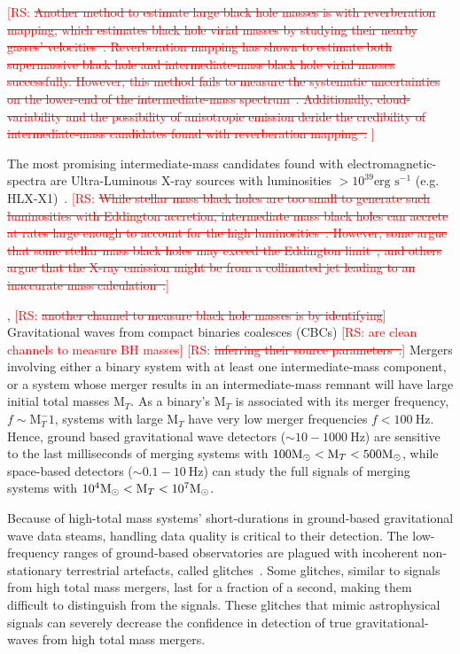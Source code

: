 \documentclass[%
 nofootinbib,
 amsmath,amssymb,
 aps,
 twocolumn
]{revtex4-2}
\newcommand{\mathcmd}[1]{{\sc \relax\ifmmode#1\else $#1$\fi}\xspace}
\newcommand{\msun}{\mathcmd{\text{M}_\odot}}
\newcommand{\rs}[1]{\textcolor{red}{[RS: #1]}}
\begin{document}
\rs{\sout{Another method to estimate large black hole masses is with reverberation mapping, which estimates black hole virial masses by studying their nearby gasses' velocities~\cite{reverberation mapping}. Reverberation mapping has shown to estimate both supermassive black hole and intermediate-mass black hole virial masses successfully. However, this method fails to measure the systematic uncertainties on the lower-end of the intermediate-mass spectrum~\cite{}. Additionally, cloud-variability and the possibility of anisotropic emission deride the credibility of intermediate-mass candidates found with reverberation mapping~\cite{}. }}

The most promising intermediate-mass candidates found with electromagnetic-spectra are Ultra-Luminous X-ray sources with luminosities $> 10^{39} \text{erg s}^{-1}$ (e.g. HLX-X1)~\cite{}. \rs{\sout{While stellar mass black holes are too small to generate such luminosities with Eddington accretion, intermediate mass black holes can accrete at rates large enough to account for the high luminosities~\cite{}. However, some argue that some stellar mass black holes may exceed the Eddington limit~\cite{}, and others argue that the X-ray emission might be from a collimated jet leading to an inaccurate mass calculation~\cite{}.}}

\Finally, \rs{\sout{another channel to measure black hole masses is by identifying}} Gravitational waves from compact binaries coalesces (CBCs) \rs{are clean channels to measure BH masses} \rs{\sout{ inferring their source parameters~\cite{}.}} Mergers involving either a binary system with at least one intermediate-mass component, or a system whose merger results in an intermediate-mass remnant will have large initial total masses $\text{M}_{T}$. As a binary's $\text{M}_{T}$ is associated with its merger frequency, $f\sim \text{M}_T^-1$, systems with large $\text{M}_{T}$ have very low merger frequencies $f < 100\ \text{Hz}$. Hence, ground based gravitational wave detectors ($\sim 10 - 1000\ \text{Hz}$) are sensitive to the last milliseconds of merging systems with $100 \msun < \text{M}_{T} < 500 \msun$, while space-based detectors ($\sim 0.1 - 10\ \text{Hz}$) can study the full signals of merging systems with $10^4 \msun < \text{M}_{T} < 10^7 \msun$. 

Because of high-total mass systems' short-durations in ground-based gravitational wave data steams, handling data quality is critical to their detection. The low-frequency ranges of ground-based observatories are plagued with incoherent non-stationary terrestrial artefacts, called glitches~\cite{ pycbc_short_duration_transients, pe_with_glitch, blip_glitches}. Some glitches, similar to signals from high total mass mergers, last for a fraction of a second, making them difficult to distinguish from the signals. These glitches that mimic astrophysical signals can severely decrease the confidence in detection of true gravitational-waves from high total mass mergers. 
\end{document}
